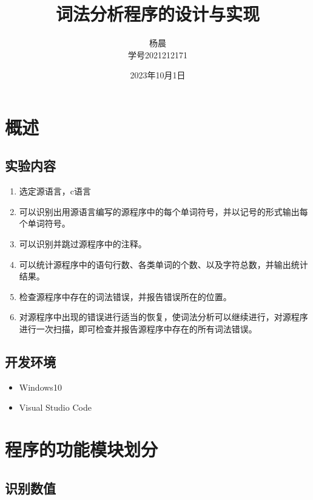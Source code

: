\documentclass[lang=cn,11pt,a4paper]{elegantpaper}
\title{词法分析程序的设计与实现}
\author{杨晨 \\学号2021212171}
\institute{北京邮电大学 计算机学院}
\date{2023年10月1日}
\begin{document}
\maketitle
\tableofcontents

\section{概述}

\subsection{实验内容}

\begin{enumerate}
    \item 选定源语言，c语言
    \item 可以识别出用源语言编写的源程序中的每个单词符号，并以记号的形式输出每个单词符号。
    \item 可以识别并跳过源程序中的注释。
    \item 可以统计源程序中的语句行数、各类单词的个数、以及字符总数，并输出统计结果。
    \item 检查源程序中存在的词法错误，并报告错误所在的位置。
    \item 对源程序中出现的错误进行适当的恢复，使词法分析可以继续进行，对源程序进行一次扫描，即可检查并报告源程序中存在的所有词法错误。
\end{enumerate}

\subsection{开发环境}

\begin{itemize}
    \item Windows10
    \item Visual Studio Code
\end{itemize}

\section{程序的功能模块划分}

\subsection{识别数值}
\end{document}
